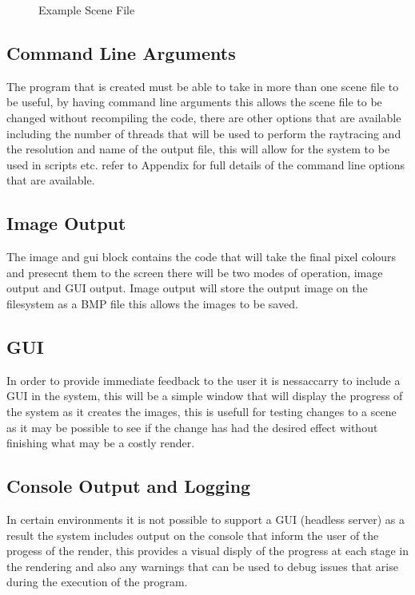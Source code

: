 \begin{figure}

\label{fig:scene_file_example}
\caption{Example Scene File}
\end{figure}

\subsection{Command Line Arguments}
The program that is created must be able to take in more than one scene file to be useful, by having command
line arguments this allows the scene file to be changed without recompiling the code, there are other options
that are available including the number of threads that will be used to perform the raytracing and the
resolution and name of the output file, this will allow for the system to be used in scripts etc. refer to
Appendix for full details of the command line options that are available.

\subsection{Image Output}
The image and gui block contains the code that will take the final pixel colours and presecnt them to the screen
there will be two modes of operation, image output and GUI output. Image output will store the output image
on the filesystem as a BMP file this allows the images to be saved.

\subsection{GUI}
In order to provide immediate feedback to the user it is nessaccarry to include a GUI in the system, this will
be a simple window that will display the progress of the system as it creates the images, this is usefull
for testing changes to a scene as it may be possible to see if the change has had the desired effect without
finishing what may be a costly render.


\subsection{Console Output and Logging}
In certain environments it is not possible to support a GUI (headless server) as a result the system includes
output on the console that inform the user of the progess of the render, this provides a visual disply of the
progress at each stage in the rendering and also any warnings that can be used to debug issues that arise
during the execution of the program.
